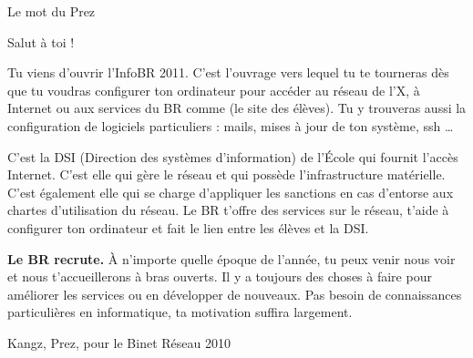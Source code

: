 

\begin{center}
    { \Huge Le mot du Prez }
\end{center}

Salut \`a toi !

Tu viens d'ouvrir l'InfoBR 2011. C'est l'ouvrage vers lequel tu te tourneras d\`es que tu voudras configurer ton ordinateur pour acc\'eder au r\'eseau de l'X, \`a Internet ou aux services du BR comme \fkz (le site des \'el\`eves). Tu y trouveras aussi la configuration de logiciels particuliers : mails, mises \`a jour de ton syst\`eme, ssh \dots
{}

C'est la DSI (Direction des syst\`emes d'information) de l'\'Ecole qui fournit l'acc\`es Internet. C'est elle qui g\`ere
le r\'eseau et qui poss\`ede l'infrastructure mat\'erielle.
C'est \'egalement elle qui se charge d'appliquer les sanctions en cas d'entorse aux chartes d'utilisation du r\'eseau. Le BR t'offre des services sur le r\'eseau, t'aide \`a configurer ton ordinateur et fait le lien entre les \'el\`eves et la DSI.

\textbf{Le BR recrute.} \`A n'importe quelle \'epoque de l'ann\'ee, tu peux venir nous voir et nous t'accueillerons \`a bras ouverts. Il y a toujours des choses \`a faire pour am\'eliorer les services ou en d\'evelopper de nouveaux. Pas besoin de connaissances particuli\`eres en informatique, ta motivation suffira largement.

\begin{flushright}
    Kangz, Prez, pour le Binet R\'eseau 2010
\end{flushright}

